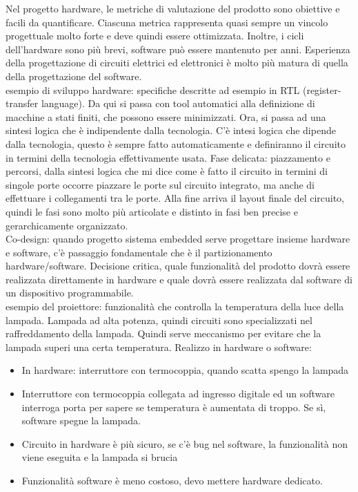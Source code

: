 \documentclass{article}
\begin{document}
Nel progetto hardware, le metriche di valutazione del prodotto sono obiettive e facili da quantificare. Ciascuna metrica rappresenta quasi sempre un vincolo progettuale molto forte e deve quindi essere ottimizzata. Inoltre, i cicli dell'hardware sono più brevi, software può essere mantenuto per anni. Esperienza della progettazione di circuiti elettrici ed elettronici è molto più matura di quella della progettazione del software.\\ esempio di sviluppo hardware: specifiche descritte ad esempio in RTL (register-transfer language). Da qui si passa con tool automatici alla definizione di macchine a stati finiti, che possono essere minimizzati. Ora, si passa ad una sintesi logica che è indipendente dalla tecnologia. C'è intesi logica che dipende dalla tecnologia, questo è sempre fatto automaticamente e definiranno il circuito in termini della tecnologia effettivamente usata. Fase delicata: piazzamento e percorsi, dalla sintesi logica che mi dice come è fatto il circuito in termini di singole porte occorre piazzare le porte sul circuito integrato, ma anche di effettuare i collegamenti tra le porte. Alla fine arriva il layout finale del circuito, quindi le fasi sono molto più articolate e distinto in fasi ben precise e gerarchicamente organizzato.\\ Co-design: quando progetto sistema embedded serve progettare insieme hardware e software, c'è passaggio fondamentale che è il partizionamento hardware/software. Decisione critica, quale funzionalità del prodotto dovrà essere realizzata direttamente in hardware e quale dovrà essere realizzata dal software di un dispositivo programmabile.\\ esempio del proiettore: funzionalità che controlla la temperatura della luce della lampada. Lampada ad alta potenza, quindi circuiti sono specializzati nel raffreddamento della lampada. Quindi serve meccanismo per evitare che la lampada superi una certa temperatura. Realizzo in hardware o software: 
\begin{itemize}
\item In hardware: interruttore con termocoppia, quando scatta spengo la lampada
\item Interruttore con termocoppia collegata ad ingresso digitale ed un software interroga porta per sapere se temperatura è aumentata di troppo. Se sì, software spegne la lampada.
\item Circuito in hardware è più sicuro, se c'è bug nel software, la funzionalità non viene eseguita e la lampada si brucia
\item Funzionalità software è meno costoso, devo mettere hardware dedicato.
\end{itemize}
\end{document}
